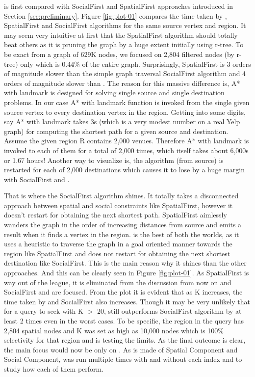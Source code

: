 {\rrp} is first compared with SocialFirst and SpatialFirst approaches introduced in Section \ref{sec:preliminary}. Figure \ref{fig:plot-01} compares the time taken by {\rrp}, SpatialFirst and SocialFirst algorithms for the same source vertex and region. It may seem very intuitive at first that the SpatialFirst algorithm should totally beat others as it is pruning the graph by a huge extent initially using r-tree. To be exact from a graph of 629K nodes, we focused on 2,804 filtered nodes (by r-tree) only which is 0.44\% of the entire graph. Surprisingly, SpatialFirst is 3 orders of magnitude slower than the simple graph traversal SocialFirst algorithm and 4 orders of magnitude slower than {\rrp}. The reason for this massive difference is, A* with landmark is designed for solving single source and single destination problems. In our case A* with landmark function is invoked from the single given source vertex to every destination vertex in the region. Getting into some digits, say A* with landmark takes 3s (which is a very modest number on a real Yelp graph) for computing the shortest path for a given source and destination. Assume the given region R contains 2,000 venues. Therefore A* with landmark is invoked to each of them for a total of 2,000 times, which itself takes about 6,000s or 1.67 hours! Another way to visualize is, the algorithm (from source) is restarted for each of 2,000 destinations which causes it to lose by a huge margin with SocialFirst and {\rrp}.

That is where the SocialFirst algorithm shines. It totally takes a disconnected approach between spatial and social constraints like SpatialFirst, however it doesn't restart for obtaining the next shortest path. SpatialFirst aimlessly wanders the graph in the order of increasing distances from source and emits a result when it finds a vertex in the region. {\rrp} is the best of both the worlds, as it uses a heuristic to traverse the graph in a goal oriented manner towards the region like SpatialFirst and does not restart for obtaining the next shortest destination like SocialFirst. This is the main reason why it shines than the other approaches. And this can be clearly seen in Figure \ref{fig:plot-01}. As SpatialFirst is way out of the league, it is eliminated from the discussion from now on and SocialFirst and {\rrp} are focused. From the plot it is evident that as K increases, the time taken  by {\rrp} and SocialFirst also increases. Though it may be very unlikely that for a query to seek with K $>$ 20, {\rrp} still outperforms SocialFirst algorithm by at least 2 times even in the worst cases. To be specific, the region in the query has 2,804 spatial nodes and K was set as high as 10,000 nodes which is 100\% selectivity for that region and is testing the limits. As the final outcome is clear, the main focus would now be only on {\rrp}. As {\rrp} is made of Spatial Component and Social Component, {\rrp} was run multiple times with and without each index and to study how each of them perform.

